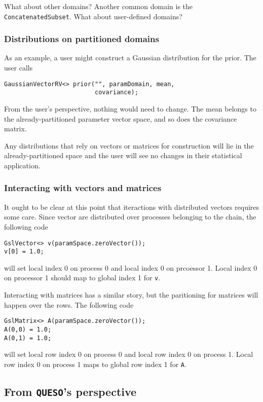 \documentclass{article}
\newcommand{\Queso}{\texttt{QUESO}}
\begin{document}
What about other domains?  Another common domain is the
\lstinline|ConcatenatedSubset|.  What about user-defined domains?

\subsubsection{Distributions on partitioned domains}

As an example, a user might construct a Gaussian distribution for the prior.
The user calls
\begin{lstlisting}
GaussianVectorRV<> prior("", paramDomain, mean,
                         covariance);
\end{lstlisting}
From the user's perspective, nothing would need to change.  The mean belongs
to the already-partitioned parameter vector space, and so does the covariance
matrix.

Any distributions that rely on vectors or matrices for construction will lie
in the already-partitioned space and the user will see no changes in their
statistical application.

\subsubsection{Interacting with vectors and matrices}

It ought to be clear at this point that iteractions with distributed vectors
requires some care.  Since vector are distributed over processes belonging to
the chain, the following code
\begin{lstlisting}
GslVector<> v(paramSpace.zeroVector());
v[0] = 1.0;
\end{lstlisting}
will set local index 0 on process 0 and local index 0 on prcoessor 1.  Local
index 0 on processor 1 should map to global index 1 for \lstinline|v|.

Interacting with matrices has a similar story, but the paritioning for matrices
will happen over the rows.  The following code
\begin{lstlisting}
GslMatrix<> A(paramSpace.zeroVector());
A(0,0) = 1.0;
A(0,1) = 1.0;
\end{lstlisting}
will set local row index 0 on process 0 and local row index 0 on process 1.
Local row index 0 on process 1 maps to global row index 1 for \lstinline|A|.

\subsection{From \Queso's perspective}
\end{document}
